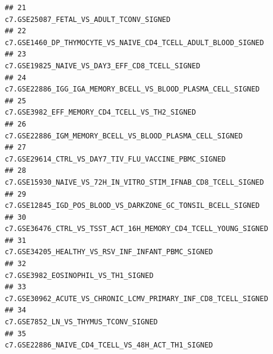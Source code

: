 \documentclass{article}\usepackage[]{graphicx}\usepackage[]{color}
\makeatletter
\newenvironment{kframe}{%
 \def\at@end@of@kframe{}%
 \ifinner\ifhmode%
  \def\at@end@of@kframe{\end{minipage}}%
  \begin{minipage}{\columnwidth}%
 \fi\fi%
 \def\FrameCommand##1{\hskip\@totalleftmargin \hskip-\fboxsep
 \colorbox{shadecolor}{##1}\hskip-\fboxsep
     \hskip-\linewidth \hskip-\@totalleftmargin \hskip\columnwidth}%
 \MakeFramed {\advance\hsize-\width
   \@totalleftmargin\z@ \linewidth\hsize
   \@setminipage}}%
 {\par\unskip\endMakeFramed%
 \at@end@of@kframe}
\newenvironment{knitrout}{}{} %
\makeatother
\begin{document}
\begin{knitrout}
\begin{kframe}
\begin{verbatim}
## 21                                                                                                                                            c7.GSE25087_FETAL_VS_ADULT_TCONV_SIGNED
## 22                                                                                                                      c7.GSE1460_DP_THYMOCYTE_VS_NAIVE_CD4_TCELL_ADULT_BLOOD_SIGNED
## 23                                                                                                                                     c7.GSE19825_NAIVE_VS_DAY3_EFF_CD8_TCELL_SIGNED
## 24                                                                                                                       c7.GSE22886_IGG_IGA_MEMORY_BCELL_VS_BLOOD_PLASMA_CELL_SIGNED
## 25                                                                                                                                      c7.GSE3982_EFF_MEMORY_CD4_TCELL_VS_TH2_SIGNED
## 26                                                                                                                           c7.GSE22886_IGM_MEMORY_BCELL_VS_BLOOD_PLASMA_CELL_SIGNED
## 27                                                                                                                               c7.GSE29614_CTRL_VS_DAY7_TIV_FLU_VACCINE_PBMC_SIGNED
## 28                                                                                                                      c7.GSE15930_NAIVE_VS_72H_IN_VITRO_STIM_IFNAB_CD8_TCELL_SIGNED
## 29                                                                                                                       c7.GSE12845_IGD_POS_BLOOD_VS_DARKZONE_GC_TONSIL_BCELL_SIGNED
## 30                                                                                                                     c7.GSE36476_CTRL_VS_TSST_ACT_16H_MEMORY_CD4_TCELL_YOUNG_SIGNED
## 31                                                                                                                                  c7.GSE34205_HEALTHY_VS_RSV_INF_INFANT_PBMC_SIGNED
## 32                                                                                                                                                c7.GSE3982_EOSINOPHIL_VS_TH1_SIGNED
## 33                                                                                                                     c7.GSE30962_ACUTE_VS_CHRONIC_LCMV_PRIMARY_INF_CD8_TCELL_SIGNED
## 34                                                                                                                                               c7.GSE7852_LN_VS_THYMUS_TCONV_SIGNED
## 35                                                                                                                                  c7.GSE22886_NAIVE_CD4_TCELL_VS_48H_ACT_TH1_SIGNED

\end{verbatim}
\end{kframe}
\end{knitrout}
\end{document}
